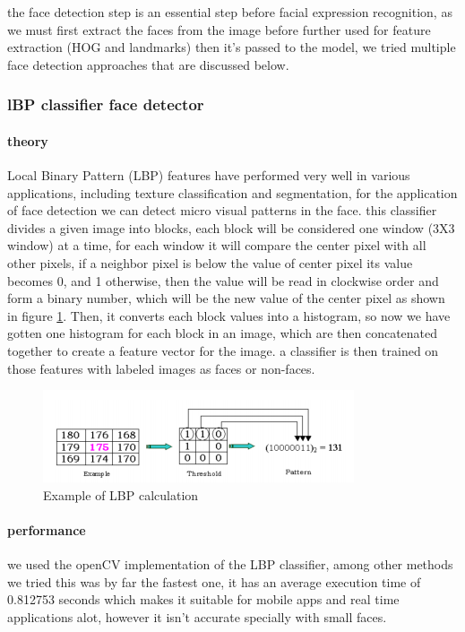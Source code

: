the face detection step is an essential step before facial expression recognition, as we must first extract the faces from the image before further used for feature extraction (HOG and landmarks) then it's passed to the model, we tried multiple face detection approaches that are discussed below.
\subsubsection{lBP classifier face detector}
\paragraph{theory}
Local Binary Pattern (LBP) features have performed very well in various applications, including texture classification and segmentation, for the application of face detection we can detect micro visual patterns in the face.\newline
this classifier divides a given image into blocks, each block will be considered one window (3X3 window) at a time, for each window it will compare the center pixel with all other pixels, if a neighbor pixel is below the value of center pixel its value becomes 0, and 1 otherwise, then the value will be read in clockwise order and form a binary number, which will be the new value of the center pixel as shown in figure \ref{fig:LBP_calculation}.\newline
Then, it converts each block values into a histogram, so now we have gotten one histogram for each block in an image, which are then concatenated together to create a feature vector for the image.\newline
a classifier is then trained on those features with labeled images as faces or non-faces.
\begin{figure}
	\centering
	\includegraphics{images/LBP_classifier.png}
	\caption{Example of LBP calculation}
	\label{fig:LBP_calculation}
\end{figure}

\paragraph{performance}
we used the openCV implementation of the LBP classifier, among other methods we tried this was by far the fastest one, it has an average execution time of 0.812753 seconds which makes it suitable for mobile apps and real time applications alot, however it isn't accurate specially with small faces.

